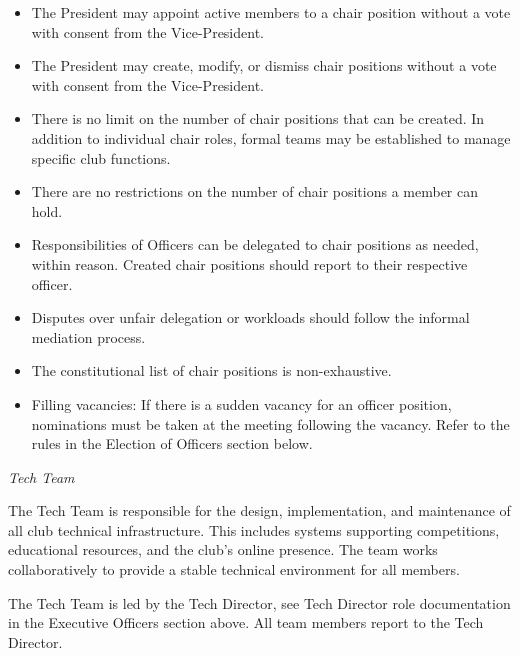 \documentclass[12pt]{article}
\begin{document}
\begin{itemize}
  \item The President may appoint active members to a chair position without a vote with consent from the Vice-President.
  \item The President may create, modify, or dismiss chair positions without a vote with consent from the Vice-President.
  \item There is no limit on the number of chair positions that can be created. In addition to individual chair roles, formal teams may be established to manage specific club functions.
  \item There are no restrictions on the number of chair positions a member can hold.
  \item Responsibilities of Officers can be delegated to chair positions as needed, within reason. Created chair positions should report to their respective officer.
  \item Disputes over unfair delegation or workloads should follow the informal mediation process.
  \item The constitutional list of chair positions is non-exhaustive.
  \item Filling vacancies: If there is a sudden vacancy for an officer position, nominations must be taken at the meeting following the vacancy. Refer to the rules in the Election of Officers section below.
\end{itemize}

\textit{Tech Team}

The Tech Team is responsible for the design, implementation, and maintenance of all club technical infrastructure. This includes systems supporting competitions, educational resources, and the club's online presence. The team works collaboratively to provide a stable technical environment for all members.

The Tech Team is led by the Tech Director, see Tech Director role documentation in the Executive Officers section above. All team members report to the Tech Director.
\end{document}

